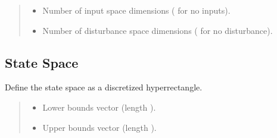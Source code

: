 \documentclass[a4paper,10pt,english]{sphinxmanual}
\begin{document}
\begin{fulllineitems}
\begin{fulllineitems}
\begin{quote}
\begin{description}
\begin{itemize}
\item {} 
\sphinxAtStartPar
{} \textendash{} Number of input space dimensions ( for no inputs).

\item {} 
\sphinxAtStartPar
{} \textendash{} Number of disturbance space dimensions ( for no disturbance).

\end{itemize}

\end{description}\end{quote}

\end{fulllineitems}



\subsection{State Space}
\label{\detokenize{api/mdp:state-space}}

\begin{fulllineitems}
\label{\detokenize{api/mdp:_CPPv4N3MDP13setStateSpaceE3vec3vec3vec}}\label{\detokenize{api/mdp:_CPPv3N3MDP13setStateSpaceE3vec3vec3vec}}\label{\detokenize{api/mdp:_CPPv2N3MDP13setStateSpaceE3vec3vec3vec}}\label{\detokenize{api/mdp:MDP::setStateSpace__vec.vec.vec}}
\pysigstartsignatures
\pysigstartmultiline
\pysiglinewithargsret
{}
{\sphinxparamcomma {}\sphinxparamcomma {}}
{}
\pysigstopmultiline
\pysigstopsignatures
\sphinxAtStartPar
Define the state space as a discretized hyper\sphinxhyphen{}rectangle.
\begin{quote}\begin{description}
\begin{itemize}
\item {} 
\sphinxAtStartPar
{} \textendash{} Lower bounds vector (length ).

\item {} 
\sphinxAtStartPar
{} \textendash{} Upper bounds vector (length ).


\end{itemize}
\end{description}
\end{quote}
\end{fulllineitems}
\end{fulllineitems}
\end{document}
